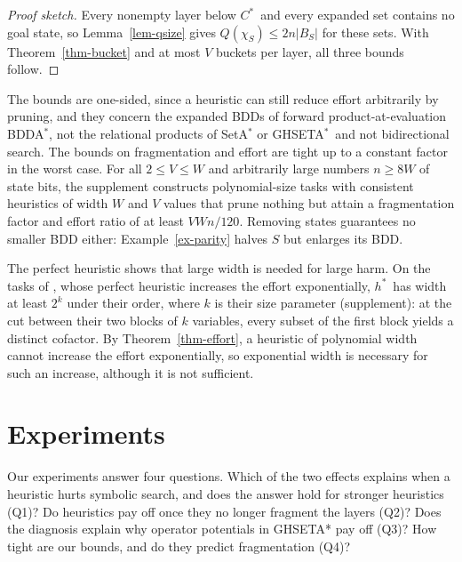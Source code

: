 \documentclass[letterpaper]{article}
\newcommand{\hstar}{\ensuremath{h^{*}}}
\newcommand{\copt}{\ensuremath{C^{*}}}
\newcommand{\bddsize}[1]{\ensuremath{|B_{#1}|}}
\newcommand{\cofcount}{\ensuremath{Q}}
\newcommand{\values}{\ensuremath{V}}
\newcommand{\bddastar}{BDDA\ensuremath{^{*}}}
\newcommand{\ghseta}{GHSETA\ensuremath{^{*}}}
\theoremstyle{plain}
\theoremstyle{definition}
\theoremstyle{remark}
\begin{document}
\begin{proof}[Proof sketch]
Every nonempty layer below \copt\ and every expanded set contains no goal state, so Lemma~\ref{lem-qsize} gives $\cofcount(\chi_S)\leq2n\bddsize{S}$ for these sets.
With Theorem~\ref{thm-bucket} and at most $\values$ buckets per layer, all three bounds follow.
\end{proof}

The bounds are one-sided, since a heuristic can still reduce effort arbitrarily by pruning, and they concern the expanded BDDs of forward product-at-evaluation \bddastar, not the relational products of SetA\ensuremath{^{*}} or \ghseta\ and not bidirectional search.
The bounds on fragmentation and effort are tight up to a constant factor in the worst case.
For all $2\leq\values\leq W$ and arbitrarily large numbers $n\geq8W$ of state bits, the supplement constructs polynomial-size tasks with consistent heuristics of width $W$ and $\values$ values that prune nothing but attain a fragmentation factor and effort ratio of at least $\values Wn/120$.
Removing states guarantees no smaller BDD either: Example~\ref{ex-parity} halves $S$ but enlarges its BDD.

The perfect heuristic shows that large width is needed for large harm.
On the tasks of \citet{speck-et-al-icaps2020}, whose perfect heuristic increases the effort exponentially, \hstar\ has width at least $2^k$ under their order, where $k$ is their size parameter (supplement): at the cut between their two blocks of $k$ variables, every subset of the first block yields a distinct cofactor.
By Theorem~\ref{thm-effort}, a heuristic of polynomial width cannot increase the effort exponentially, so exponential width is necessary for such an increase, although it is not sufficient.

\section{Experiments}
\label{sec-experiments}

Our experiments answer four questions.
Which of the two effects explains when a heuristic hurts symbolic search, and does the answer hold for stronger heuristics (Q1)?
Do heuristics pay off once they no longer fragment the layers (Q2)?
Does the diagnosis explain why operator potentials in GHSETA* pay off (Q3)?
How tight are our bounds, and do they predict fragmentation (Q4)?
\end{document}
